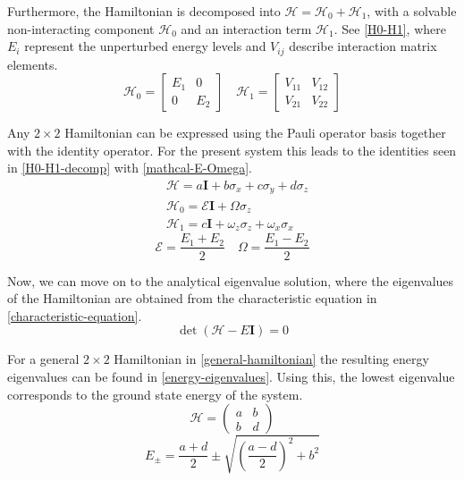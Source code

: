 Furthermore, the Hamiltonian is decomposed into $\mathcal{H}=\mathcal{H}_0+\mathcal{H}_1$, with a solvable non-interacting component $\mathcal{H}_0$ and an interaction term $\mathcal{H}_1$. See \cref{H0-H1}, where $E_i$ represent the unperturbed energy levels and $V_{ij}$ describe interaction matrix elements.
\begin{equation}\label{H0-H1}
    \mathcal{H}_0=\begin{bmatrix}
        E_1 & 0 \\
        0 & E_2
    \end{bmatrix}\quad
    \mathcal{H}_1=\begin{bmatrix}
        V_{11} & V_{12} \\
        V_{21} & V_{22}
    \end{bmatrix}
\end{equation} 

Any $2\times2$ Hamiltonian can be expressed using the Pauli operator basis together with the identity operator. For the present system this leads to the identities seen in \cref{H0-H1-decomp} with \cref{mathcal-E-Omega}. 
\begin{equation}\label{H0-H1-decomp}
\begin{aligned}
    &\mathcal{H}=a\textbf{I}+b\sigma_x+c\sigma_y+d\sigma_z\\
    &\mathcal{H}_0 = \mathcal{E}\textbf{I} + \Omega\sigma_z \\
    &\mathcal{H}_1 = c\textbf{I} + \omega_z\sigma_z + \omega_x\sigma_x
\end{aligned}
\end{equation}
\begin{equation}\label{mathcal-E-Omega}
    \mathcal{E}=\frac{E_1+E_2}{2} \quad \Omega=\frac{E_1-E_2}{2}
\end{equation}

Now, we can move on to the analytical eigenvalue solution, where the eigenvalues of the Hamiltonian are obtained from the characteristic equation in \cref{characteristic-equation}.
\begin{equation}\label{characteristic-equation}
    \det(\mathcal{H}-E\textbf{I})=0
\end{equation}

For a general $2\times2$ Hamiltonian in \cref{general-hamiltonian} the resulting energy eigenvalues can be found in \cref{energy-eigenvalues}. Using this, the lowest eigenvalue corresponds to the ground state energy of the system.
\begin{equation}\label{general-hamiltonian}
    \mathcal{H}=\begin{pmatrix}
        a&b\\b&d
    \end{pmatrix}
\end{equation}
\begin{equation}\label{energy-eigenvalues}
    E_{\pm} = \frac{a+d}{2}\pm\sqrt{\left(\frac{a-d}{2}\right)^2+b^2}
\end{equation} 


